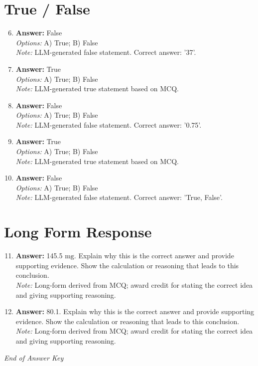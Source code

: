 \documentclass[12pt]{article}
\begin{document}
\section*{True / False}
\begin{enumerate}[label=\arabic*.]
\setcounter{enumi}{5}
\item \textbf{Answer:} False
\\ \textit{Options:} A) True; B) False
\\ \textit{Note:} LLM-generated false statement. Correct answer: '37'.
\item \textbf{Answer:} True
\\ \textit{Options:} A) True; B) False
\\ \textit{Note:} LLM-generated true statement based on MCQ.
\item \textbf{Answer:} False
\\ \textit{Options:} A) True; B) False
\\ \textit{Note:} LLM-generated false statement. Correct answer: '0.75'.
\item \textbf{Answer:} True
\\ \textit{Options:} A) True; B) False
\\ \textit{Note:} LLM-generated true statement based on MCQ.
\item \textbf{Answer:} False
\\ \textit{Options:} A) True; B) False
\\ \textit{Note:} LLM-generated false statement. Correct answer: 'True, False'.
\end{enumerate}

\section*{Long Form Response}
\begin{enumerate}[label=\arabic*.]
\setcounter{enumi}{10}
\item \textbf{Answer:} 145.5 $\mathrm{mg}$. Explain why this is the correct answer and provide supporting evidence. Show the calculation or reasoning that leads to this conclusion.
\\ \textit{Note:} Long-form derived from MCQ; award credit for stating the correct idea and giving supporting reasoning.
\item \textbf{Answer:} 80.1. Explain why this is the correct answer and provide supporting evidence. Show the calculation or reasoning that leads to this conclusion.
\\ \textit{Note:} Long-form derived from MCQ; award credit for stating the correct idea and giving supporting reasoning.
\end{enumerate}

\vfill
\noindent\textit{End of Answer Key}
\end{document}
